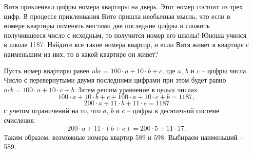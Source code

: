 
Витя приклеивал цифры номера квартиры на дверь. Этот номер состоит из трех цифр. 
В процессе приклеивания Вите пришла необычная мысль, что если в номере квартиры 
поменять местами две последние цифры и сложить получившееся число с исходным, 
то получится номер его школы! Юноша учился в школе 1187. Найдите все такие номера квартир, 
и если Витя живет в квартире с наименьшим из них, то в какой квартире он живет?

\soultionSection

Пусть номер квартиры равен $\overline{abc} = 100\cdot a + 10\cdot b + c$, где $a$, $b$ и $c$ -- цифры числа. Число с перевернутыми двумя последними цифрами при этом будет равно $\overline{acb} = 100\cdot a + 10\cdot c + b$. Затем решим уравнение в целых числах 
$$100 \cdot a + 10\cdot b + c + 100\cdot a + 10\cdot c + b = 1187,$$ 
$$200 \cdot a + 11\cdot b + 11\cdot c = 1187$$ с учетом ограничений на то, что $a$, $b$ и $c$ -- цифры в десятичной системе счисления.
$$200\cdot a + 11\cdot (b + c) = 200 \cdot 5 + 11 \cdot 17.$$
Таким образом, возможные номера квартир $589$ и $598$. Выбираем наименьший -- 589.

